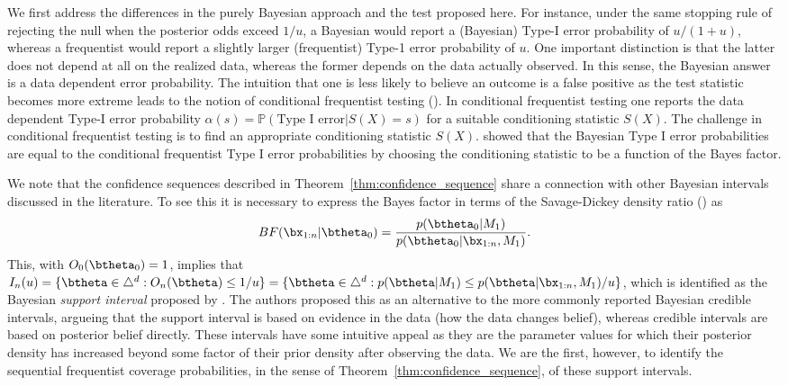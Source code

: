 \documentclass[11pt]{article}
\begin{document}
We first address the differences in the purely Bayesian approach and the test proposed here.
For instance, under the same stopping rule of rejecting the null when the posterior odds exceed $1/u$, a Bayesian would report a (Bayesian) Type-I error probability of $u/(1+u)$, whereas a frequentist would report a slightly larger (frequentist) Type-1 error probability of $u$.
One important distinction is that the latter does not depend at all on the realized data, whereas the former depends on the data actually observed.
In this sense, the Bayesian answer is a data dependent error probability.
The intuition that one is less likely to believe an outcome is a false positive as the test statistic becomes more extreme leads to the notion of conditional frequentist testing (\cite{kiefer}).
In conditional frequentist testing one reports the data dependent Type-I error probability $\alpha(s) = \mathbb{P}(\text{Type I error} | S(X) = s)$ for a suitable conditioning statistic $S(X)$.
The challenge in conditional frequentist testing is to find an appropriate conditioning statistic $S(X)$.
\cite{conditional_frequentist_composite} showed that the Bayesian Type I error probabilities are equal to the conditional frequentist Type I error probabilities by choosing the conditioning statistic to be a function of the Bayes factor.

We note that the confidence sequences described in Theorem~\ref{thm:confidence_sequence} share a connection with other Bayesian intervals discussed in the literature.
To see this it is necessary to express the Bayes factor in terms of the Savage-Dickey density ratio (\cite{dickey}) as
\begin{equation}
    BF(\bx_{1:n}|\btheta_0) = \frac{p(\btheta_0| M_1)}{p(\btheta_0|\bx_{1:n},M_1)}.
\end{equation}
This, with $O_0(\btheta_0)=1$, implies that $I_n(u) = \lbrace \btheta \in \triangle^d : O_n(\btheta) \leq 1/u \rbrace = \lbrace \btheta  \in \triangle^d : p(\btheta| M_1)\leq p(\btheta|\bx_{1:n}, M_1)/u \rbrace $, which is identified as the Bayesian \textit{support interval} proposed by \cite{support_interval}.
The authors proposed this as an alternative to the more commonly reported Bayesian credible intervals, argueing that the support interval is based on evidence in the data (how the data changes belief), whereas credible intervals are based on posterior belief directly.
These intervals have some intuitive appeal as they are the parameter values for which their posterior density has increased beyond some factor of their prior density after observing the data.
We are the first, however, to identify the sequential frequentist coverage probabilities, in the sense of Theorem~\ref{thm:confidence_sequence}, of these support intervals.
\end{document}
